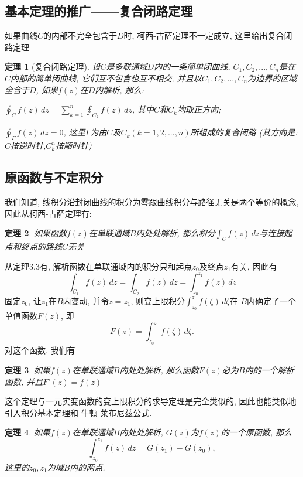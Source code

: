 \documentclass[12pt, a4paper, oneside]{ctexart}
\theoremstyle{plain}
\newtheorem{theorem}{定理}[section]
\theoremstyle{definition}
\theoremstyle{definition}
\begin{document}
\subsection{基本定理的推广——复合闭路定理}
如果曲线$C$的内部不完全包含于$D$时, 柯西-古萨定理不一定成立, 这里给出复合闭路定理
\begin{theorem}[复合闭路定理]
    \hspace{0em}
    
    设$C$是多联通域$D$内的一条简单闭曲线, $C_1,C_2,...,C_n$是在$C$内部的简单闭曲线, 它们互不包含也互不相交, 
并且以$C_1,C_2,...,C_n$为边界的区域全含于$D$, 如果$f(z)$在$D$内解析, 那么: 

$\oint_{C}f(z)\,dz=\sum_{k=1}^{n}\oint_{C_k}f(z)\,dz$, 其中$C$和$C_k$均取正方向; 

$\oint_{\Gamma}f(z)\,dz=0$, 这里$\Gamma$为由$C$及$C_k(k=1,2,...,n)$所组成的复合闭路
(其方向是:$C$按逆时针,$C_k^n$按顺时针)

\end{theorem}
\subsection{原函数与不定积分}
我们知道, 线积分沿封闭曲线的积分为零跟曲线积分与路径无关是两个等价的概念, 因此从柯西-古萨定理有:
\begin{theorem}
    如果函数$f(z)$在单联通域$B$内处处解析, 那么积分$\int_Cf(z)\,dz$与连接起点和终点的路线$C$无关
\end{theorem}
从定理3.3有, 解析函数在单联通域内的积分只和起点$z_0$及终点$z_1$有关, 因此有
\[
\int_{C_1}f(z)\,dz=\int_{C_2}f(z)\,dz=\int_{z_0}^{z_1}f(z)\,dz
\]
固定$z_0$, 让$z_1$在$B$内变动, 并令$z=z_1$, 则变上限积分$\int_{z_0}^{z}f(\zeta)\,d\zeta$在
$B$内确定了一个单值函数$F(z)$, 即
\[
F(z)=\int_{z_0}^{z}f(\zeta)\,d\zeta.
\]
对这个函数, 我们有
\begin{theorem}
    如果$f(z)$在单联通域$B$内处处解析, 那么函数$F(z)$必为$B$内的一个解析函数, 并且$F'(z)=f(z)$
\end{theorem}
\noindent 这个定理与一元实变函数的变上限积分的求导定理是完全类似的, 因此也能类似地引入积分基本定理和
牛顿-莱布尼兹公式.
\begin{theorem}
    如果$f(z)$在单联通域$B$内处处解析, $G(z)$为$f(z)$的一个原函数, 那么
    \[
        \int_{z_0}^{z_1}f(z)\,dz=G(z_1)-G(z_0),
    \]
    这里的$z_0,z_1$为域$B$内的两点.
\end{theorem}
\end{document}

